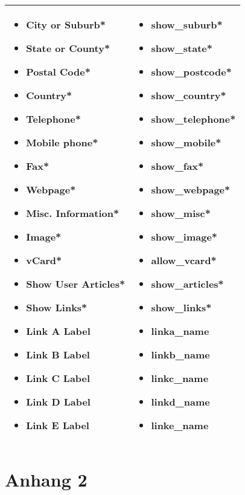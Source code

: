 \begin{minipage}{0.6\textwidth}
\begin{tabular}{|p{} | p{}|}
\hline
\begin{itemize}
\item City or Suburb*
\item State or County* 
\item Postal Code* 
\item Country*
\item Telephone* 
\item Mobile phone* 
\item Fax*
\item Webpage* 
\item Misc. Information* 
\item Image* 
\item vCard* 
\item Show User Articles* 
\item Show Links* 
\item Link A Label 
\item Link B Label 
\item Link C Label 
\item Link D Label 
\item Link E Label
\end{itemize}
 & 
\begin{itemize}
\item show\_suburb* 
\item show\_state* 
\item show\_postcode* 
\item show\_country* 
\item show\_telephone* 
\item show\_mobile* 
\item show\_fax* 
\item show\_webpage* 
\item show\_misc* 
\item show\_image* 
\item allow\_vcard* 
\item show\_articles* 
\item show\_links* 
\item linka\_name 
\item linkb\_name 
\item linkc\_name 
\item linkd\_name 
\item linke\_name
\end{itemize}
\\ \hline
\end{tabular}
\end{minipage}


\chapter{Anhang 2}

